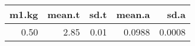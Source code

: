 \begin{table}[ht]
\centering
\begin{tabular}{rrrrr}
  \hline
m1.kg & mean.t & sd.t & mean.a & sd.a \\ 
  \hline
0.50 & 2.85 & 0.01 & 0.0988 & 0.0008 \\ 
   \hline
\end{tabular}
\end{table}
